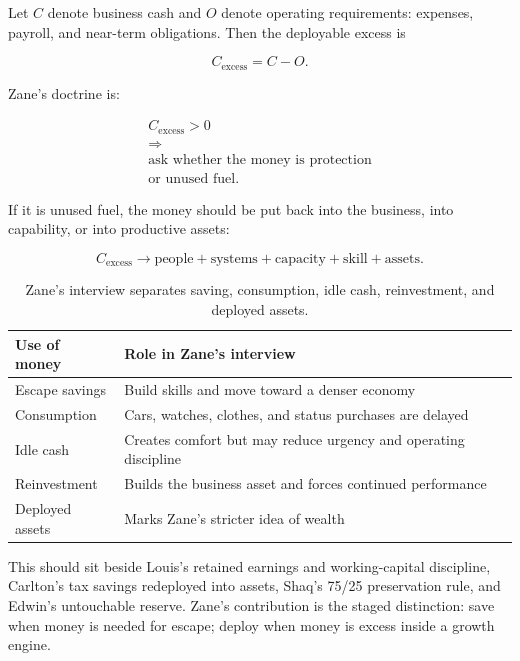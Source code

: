 \documentclass[11pt,oneside]{book}
\begin{document}
Let \(C\) denote business cash and \(O\) denote operating requirements: expenses, payroll, and near-term obligations. Then the deployable excess is

\begin{equation}
C_{\mathrm{excess}}=C-O.
\end{equation}

Zane's doctrine is:

\begin{equation}
\begin{gathered}
C_{\mathrm{excess}}>0\\
\Longrightarrow\\
\text{ask whether the money is protection}\\
\text{or unused fuel}.
\end{gathered}
\end{equation}

If it is unused fuel, the money should be put back into the business, into capability, or into productive assets:

\begin{equation}
C_{\mathrm{excess}}
\longrightarrow
\text{people}+\text{systems}+\text{capacity}+\text{skill}+\text{assets}.
\end{equation}

\begin{table}
\centering
\begin{tabular}{|p{.30\linewidth}|p{.56\linewidth}|}
\hline
Use of money & Role in Zane's interview\\
\hline
Escape savings & Build skills and move toward a denser economy\\
\hline
Consumption & Cars, watches, clothes, and status purchases are delayed\\
\hline
Idle cash & Creates comfort but may reduce urgency and operating discipline\\
\hline
Reinvestment & Builds the business asset and forces continued performance\\
\hline
Deployed assets & Marks Zane's stricter idea of wealth\\
\hline
\end{tabular}
\caption{Zane's interview separates saving, consumption, idle cash, reinvestment, and deployed assets.}
\end{table}

This should sit beside Louis's retained earnings and working-capital discipline, Carlton's tax savings redeployed into assets, Shaq's 75/25 preservation rule, and Edwin's untouchable reserve. Zane's contribution is the staged distinction: save when money is needed for escape; deploy when money is excess inside a growth engine.
\end{document}
